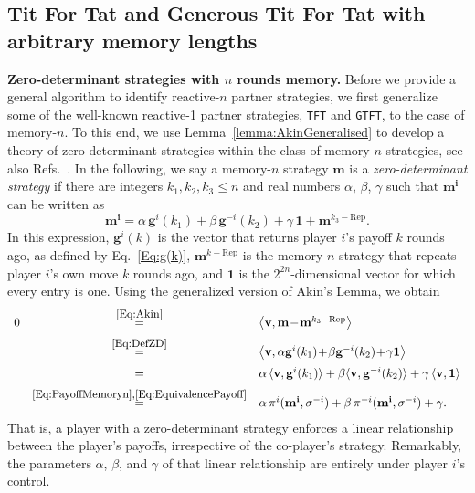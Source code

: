 \documentclass[11pt]{article}
\theoremstyle{plainCl1}
\theoremstyle{plainCl2}
\def\tft{\texttt{TFT}}
\def\gtft{\texttt{GTFT}}
\begin{document}

\subsection{Tit For Tat and Generous Tit For Tat with arbitrary memory lengths}\label{section:tft_and_gtft}

{\bf Zero-determinant strategies with $n$ rounds memory.}
Before we provide a general algorithm to identify reactive-$n$ partner strategies, we first generalize some of the well-known reactive-1 partner strategies, \tft{} and \gtft{}, to the case of memory-$n$. 
To this end, we use Lemma~\ref{lemma:AkinGeneralised} to develop a theory of zero-determinant strategies within the class of memory-$n$ strategies, see also Refs.~\citep{stewart:scientific:2016,ueda:RSOP:2021}.
In the following, we say a memory-$n$ strategy $\mathbf{m}$ is a {\it zero-determinant
strategy} if there are integers $k_1, k_2, k_3\!\le\!n$ and real numbers $\alpha$, $\beta$, $\gamma$ such
that $\mathbf{m^{i}}$ can be written as
\begin{equation} \label{Eq:DefZD}
\mathbf{m^{i}} = \alpha\, \mathbf{g}^i(k_1) + \beta\, \mathbf{g}^{-i}(k_2) + \gamma\, \mathbf{1} + \mathbf{m}^{k_3-\text{Rep}}. 
\end{equation}
In this expression, $\mathbf{g}^i(k)$ is the vector that returns player $i$'s payoff $k$ rounds ago, as defined by Eq.~\eqref{Eq:g(k)}, $\mathbf{m}^{k-\text{Rep}}$ is the memory-$n$ strategy that repeats player $i$'s own move $k$ rounds ago, and $\mathbf{1}$ is the $2^{2n}$-dimensional vector for which every entry is one. Using the generalized version of Akin's Lemma, we obtain
\begin{equation} \label{Eq:PayoffZD}
\begin{array}{lcl}
0 
&\stackrel{\mbox{\small \eqref{Eq:Akin}}}{=}  
&\big\langle \mathbf{v} , \mathbf{m}\!-\!\mathbf{m}^{k_3-\text{Rep}}\big\rangle\\[0.2cm]
&\stackrel{\mbox{\small \eqref{Eq:DefZD}}}{=} 
&\big\langle \mathbf{v} ,\alpha \mathbf{g}^i(k_1) \!+\! \beta \mathbf{g}^{-i}(k_2) \!+\! \gamma \mathbf{1} \big\rangle\\[0.2cm]
&= 
&\alpha \, \langle \mathbf{v},\mathbf{g}^i(k_1)\rangle + \beta \langle \mathbf{v},\mathbf{g}^{-i}(k_2) \rangle+\gamma\,\langle\mathbf{v},\mathbf{1}\rangle\\[0.2cm]
&\stackrel{\mbox{\small \eqref{Eq:PayoffMemoryn},\eqref{Eq:EquivalencePayoff}}}{=} 
&\alpha \, \pi^i(\mathbf{m^i},\sigma^{-i}) + \beta \, \pi^{-i}(\mathbf{m^i},\sigma^{-i}) + \gamma.
\end{array}
\end{equation}
That is, a player with a zero-determinant strategy enforces a linear relationship between the player's payoffs, irrespective of the co-player's strategy. 
Remarkably, the parameters $\alpha$, $\beta$, and $\gamma$ of that linear relationship are entirely under player $i$'s control.\\
\end{document}
